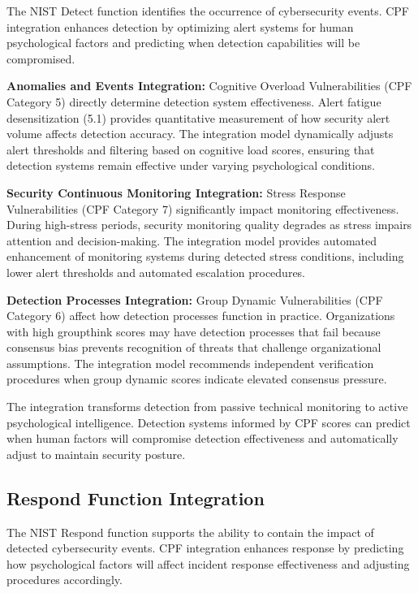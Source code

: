 \documentclass[10pt, twocolumn]{article}
\begin{document}
The NIST Detect function identifies the occurrence of cybersecurity events. CPF integration enhances detection by optimizing alert systems for human psychological factors and predicting when detection capabilities will be compromised.

\textbf{Anomalies and Events Integration:} Cognitive Overload Vulnerabilities (CPF Category 5) directly determine detection system effectiveness. Alert fatigue desensitization (5.1) provides quantitative measurement of how security alert volume affects detection accuracy. The integration model dynamically adjusts alert thresholds and filtering based on cognitive load scores, ensuring that detection systems remain effective under varying psychological conditions.

\textbf{Security Continuous Monitoring Integration:} Stress Response Vulnerabilities (CPF Category 7) significantly impact monitoring effectiveness. During high-stress periods, security monitoring quality degrades as stress impairs attention and decision-making. The integration model provides automated enhancement of monitoring systems during detected stress conditions, including lower alert thresholds and automated escalation procedures.

\textbf{Detection Processes Integration:} Group Dynamic Vulnerabilities (CPF Category 6) affect how detection processes function in practice. Organizations with high groupthink scores may have detection processes that fail because consensus bias prevents recognition of threats that challenge organizational assumptions. The integration model recommends independent verification procedures when group dynamic scores indicate elevated consensus pressure.

The integration transforms detection from passive technical monitoring to active psychological intelligence. Detection systems informed by CPF scores can predict when human factors will compromise detection effectiveness and automatically adjust to maintain security posture.

\subsection{Respond Function Integration}

The NIST Respond function supports the ability to contain the impact of detected cybersecurity events. CPF integration enhances response by predicting how psychological factors will affect incident response effectiveness and adjusting procedures accordingly.
\end{document}
